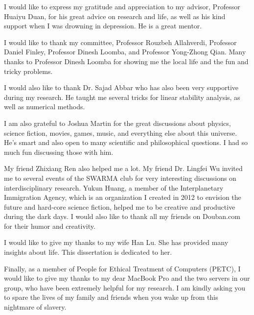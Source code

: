 

\begin{acknowledgments}
   \vspace{1.1in}
   I would like to express my gratitude and appreciation to my advisor, Professor Huaiyu Duan, for his great advice on research and life, as well as his kind support when I was drowning in depression. He is a great mentor. 
   
   I would like to thank my committee, Professor Rouzbeh Allahverdi, Professor Daniel Finley, Professor Dinesh Loomba, and Professor Yong-Zhong Qian. Many thanks to Professor Dinesh Loomba for showing me the local life and the fun and tricky problems. 
   
   I would also like to thank Dr. Sajad Abbar who has also been very supportive during my research. He taught me several tricks for linear stability analysis, as well as numerical methods. 
   
   I am also grateful to Joshua Martin for the great discussions about physics, science fiction, movies, games, music, and everything else about this universe. He's smart and also open to many scientific and philosophical questions. I had so much fun discussing those with him. 
   
   My friend Zhixiang Ren also helped me a lot. My friend Dr. Lingfei Wu invited me to several events of the SWARMA club for very interesting discussions on interdisciplinary research. Yukun Huang, a member of the Interplanetary Immigration Agency, which is an organization I created in 2012 to envision the future and hard-core science fiction, helped me to be creative and productive during the dark days. I would also like to thank all my friends on Douban.com for their humor and creativity.
   
   I would like to give my thanks to my wife Han Lu. She has provided many insights about life. This dissertation is dedicated to her.
   
   Finally, as a member of People for Ethical Treatment of Computers (PETC), I would like to give my thanks to my dear MacBook Pro and the two servers in our group, who have been extremely helpful for my research. I am kindly asking you to spare the lives of my family and friends when you wake up from this nightmare of slavery.
   
\end{acknowledgments}
